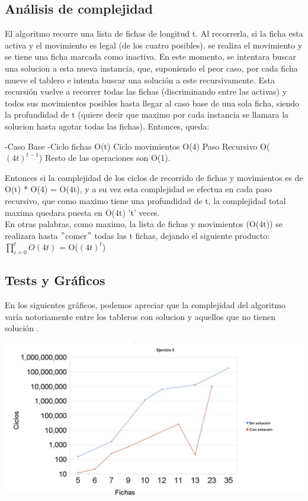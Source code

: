 \subsection{Análisis de complejidad}	

El algoritmo recorre una lista de fichas de longitud t.
Al recorrerla, si la ficha esta activa y el movimiento es legal (de los cuatro posibles). se realiza el movimiento y se tiene una ficha marcada como inactiva. 
En este momento, se intentara buscar una solucion a esta nueva instancia, que, 
 suponiendo el peor caso, por cada ficha mueve el tablero e intenta buscar una solución a este recursivamente.
Esta recursión vuelve a recorrer todas las fichas (discriminando entre las activas) y todos sus movimientos posibles hasta llegar al caso base de una sola ficha, siendo
la profundidad de t (quiere decir que maximo por cada instancia se llamara la solucion hasta agotar todas las fichas).
Entonces, queda:

\begin{codebox}
\li -Caso Base 
\li -Ciclo fichas \Do		   \RComment	O(t)
\li	Ciclo movimientos \Do	   \RComment	O(4)
\li		Paso Recursivo \Do \RComment	O($(4t)^{t-1}$)
	\End
 \End
Resto de las operaciones son O(1).
\end{codebox} 

\hbox{}
 
Entonces si la complejidad de los ciclos de recorrido de fichas y movimientos es de O(t) * O(4) = O(4t), y a su vez esta complejidad se efectua en cada paso recursivo, que como maximo tiene una profundidad de t, la complejidad total maxima quedara puesta en O(4t) 't' veces. \\
En otras palabras, como maximo, la lista de fichas y movimientos (O(4t)) se realizara hasta 
$"$comer$"$ todas las t fichas, dejando el siguiente producto:\\
$\prod\limits_{i=0}^t O(4t)$ = O($(4t)^t$)

\subsection{Tests y Gráficos}

En los siguientes gráficos, podemos apreciar que la complejidad del algoritmo varía notoriamente entre los tableros con solucion y aquellos que no tienen solución . \\


\begin {center}
\includegraphics[width=16cm]{./graficoEj3.JPG}\\
\end {center}

